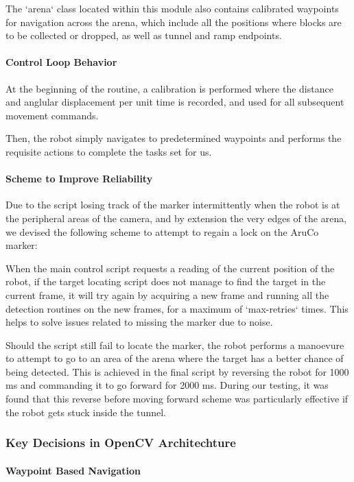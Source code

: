 \documentclass{article}
\begin{document}
The `arena` class located within this module also contains calibrated waypoints for navigation across the arena, which include all the positions where blocks are to be collected or dropped, as well as tunnel and ramp endpoints.

\paragraph{Control Loop Behavior}
At the beginning of the routine, a calibration is performed where the distance and anglular displacement per unit time is recorded, and used for all subsequent movement commands.

Then, the robot simply navigates to predetermined waypoints and performs the requisite actions to complete the tasks set for us.

\paragraph{Scheme to Improve Reliability}

Due to the script losing track of the marker intermittently when the robot is at the peripheral areas of the camera, and by extension the very edges of the arena, we devised the following scheme to attempt to regain a lock on the AruCo marker:

When the main control script requests a reading of the current position of the robot, if the target locating script does not manage to find the target in the current frame, it will try again by acquiring a new frame and running all the detection routines on the new frames, for a maximum of `max-retries` times. This helps to solve issues related to missing the marker due to noise.

Should the script still fail to locate the marker, the robot performs a manoevure to attempt to go to an area of the arena where the target has a better chance of being detected. This is achieved in the final script by reversing the robot for 1000 ms and commanding it to go forward for 2000 ms. During our testing, it was found that this reverse before moving forward scheme was particularly effective if the robot gets stuck inside the tunnel.

\subsubsection{Key Decisions in OpenCV Architechture}

\paragraph{Waypoint Based Navigation}
\end{document}

